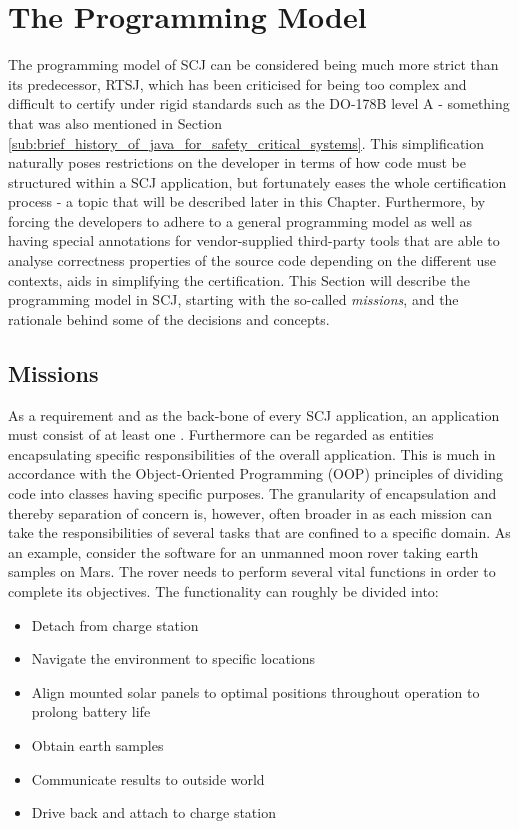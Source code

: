 \section{The Programming Model}
\label{section:programmingmodel}
The programming model of SCJ can be considered being much more strict than its predecessor, RTSJ, which has been criticised for being too complex and difficult to certify under rigid standards such as the DO-178B level A - something that was also mentioned in Section \ref{sub:brief_history_of_java_for_safety_critical_systems}. This simplification naturally poses restrictions on the developer in terms of how code must be structured within a SCJ application, but fortunately eases the whole certification process - a topic that will be described later in this Chapter. Furthermore, by forcing the developers to adhere to a general programming model as well as having special annotations for vendor-supplied third-party tools that are able to analyse correctness properties of the source code depending on the different use contexts, aids in simplifying the certification. This Section will describe the programming model in SCJ, starting with the so-called \textit{missions}, and the rationale behind some of the decisions and concepts.


\subsection{Missions}
As a requirement and as the back-bone of every SCJ application, an application must consist of at least one . Furthermore  can be regarded as entities encapsulating specific responsibilities of the overall application. This is much in accordance with the Object-Oriented Programming (OOP) principles of dividing code into classes having specific purposes. The granularity of encapsulation and thereby separation of concern is, however, often broader in  as each mission can take the responsibilities of several tasks that are confined to a specific domain. As an example, consider the software for an unmanned moon rover taking earth samples on Mars. The rover needs to perform several vital functions in order to complete its objectives. The functionality can roughly be divided into:

\begin{itemize}
	\item Detach from charge station
	\item Navigate the environment to specific locations
	\item Align mounted solar panels to optimal positions throughout operation to prolong battery life
	\item Obtain earth samples
	\item Communicate results to outside world
	\item Drive back and attach to charge station
\end{itemize}

